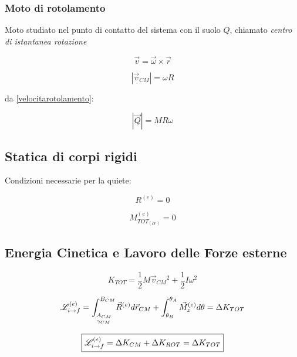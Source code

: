 \subsubsection{Moto di rotolamento}
Moto studiato nel punto di contatto del sistema con il suolo $Q$, chiamato \emph{centro di istantanea rotazione}

\begin{equation}
    \vec{v} = \vec{\omega} \times \vec{r}
\end{equation}

\begin{equation}
    |\vec{v}_{CM}| =\omega R
    \label{velocitarotolamento}
\end{equation}

da \eqref{velocitarotolamento}:

\begin{equation}
    |\vec{Q}| = M R \omega
\end{equation}

\subsection{Statica di corpi rigidi}
Condizioni necessarie per la quiete:

\begin{equation*}
    R^{(e)} = 0
\end{equation*}

\begin{equation*}
    M^{(e)}_{TOT_{(O')}}= 0
\end{equation*}

\subsection{Energia Cinetica e Lavoro delle Forze esterne}

\begin{equation}
    \boxed{K_{TOT} = \frac{1}{2} M \vec{v}_{CM}{^2} + \frac{1}{2} I \omega^2}
\end{equation}

\vspace{\baselineskip}

\begin{equation*}
    \mathscr{L}_{i \to f}^{(e)} = \underset{\gamma_{CM}}{\int_{A_{CM}}^{B_{CM}}}\vec{R}^{(e)} d\vec{r}_{CM} + \int_{\theta_{B}}^{\theta_{A}}\vec{M}_z^{(e)} d\theta = \Delta K_{TOT}
\end{equation*}

\begin{equation}
    \boxed{\mathscr{L}_{i \to f}^{(e)} = \Delta K_{CM} + \Delta K_{ROT} = \Delta K_{TOT}}
\end{equation}
